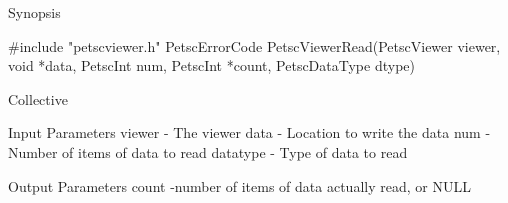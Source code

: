Synopsis

#include "petscviewer.h" 
PetscErrorCode  PetscViewerRead(PetscViewer viewer, void *data, PetscInt num, PetscInt *count, PetscDataType dtype)

Collective

Input Parameters
	viewer 	- The viewer
	data 	- Location to write the data
	num 	- Number of items of data to read
	datatype 	- Type of data to read

Output Parameters
count -number of items of data actually read, or NULL

